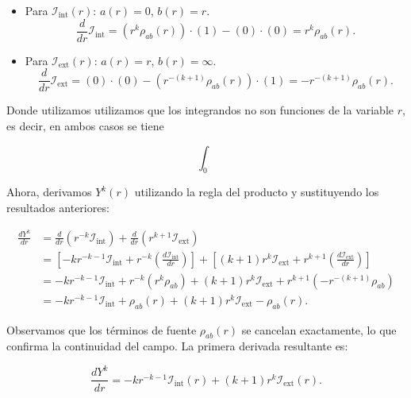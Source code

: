 \documentclass[12pt, a4paper, oneside, spanish]{book}
\begin{document}
\begin{itemize}
    \item Para $\mathcal{I}_{\text{int}}(r)$: $a(r)=0$, $b(r)=r$.
    \begin{equation}
        \frac{d}{dr}\mathcal{I}_{\text{int}} = (r^k \rho_{ab}(r)) \cdot (1) - (0) \cdot (0) = r^k \rho_{ab}(r).
    \end{equation}
    
    \item Para $\mathcal{I}_{\text{ext}}(r)$: $a(r)=r$, $b(r)=\infty$.
    \begin{equation}
        \frac{d}{dr}\mathcal{I}_{\text{ext}} = (0) \cdot (0) - (r^{-(k+1)} \rho_{ab}(r)) \cdot (1) = -r^{-(k+1)} \rho_{ab}(r).
    \end{equation}
\end{itemize}

Donde utilizamos utilizamos que los integrandos no son funciones de la variable \( r \), es decir, en ambos casos se tiene

\[ \int_0^{} \]

Ahora, derivamos $Y^k(r)$ utilizando la regla del producto y sustituyendo los resultados anteriores:

\begin{align*}
    \frac{dY^k}{dr} &= \frac{d}{dr}\left( r^{-k} \mathcal{I}_{\text{int}} \right) + \frac{d}{dr}\left( r^{k+1} \mathcal{I}_{\text{ext}} \right) \\
    &= \left[ -k r^{-k-1} \mathcal{I}_{\text{int}} + r^{-k} \left( \frac{d\mathcal{I}_{\text{int}}}{dr} \right) \right] + \left[ (k+1) r^k \mathcal{I}_{\text{ext}} + r^{k+1} \left( \frac{d\mathcal{I}_{\text{ext}}}{dr} \right) \right] \\
    &= -k r^{-k-1} \mathcal{I}_{\text{int}} + r^{-k} (r^k \rho_{ab}) + (k+1) r^k \mathcal{I}_{\text{ext}} + r^{k+1} (-r^{-(k+1)} \rho_{ab}) \\
    &= -k r^{-k-1} \mathcal{I}_{\text{int}} + \rho_{ab}(r) + (k+1) r^k \mathcal{I}_{\text{ext}} - \rho_{ab}(r).
\end{align*}

Observamos que los términos de fuente $\rho_{ab}(r)$ se cancelan exactamente, lo que confirma la continuidad del campo. La primera derivada resultante es:

\begin{equation}
\label{eq:Yk-prime-app}
    \frac{dY^k}{dr} = -k r^{-k-1} \mathcal{I}_{\text{int}}(r) + (k+1) r^k \mathcal{I}_{\text{ext}}(r).
\end{equation}
\end{document}
